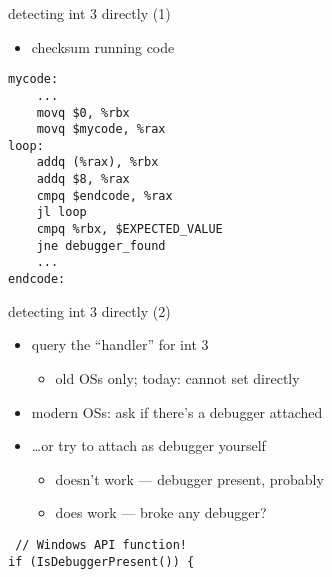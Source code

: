 \begin{frame}[fragile,label=int3Check]{detecting int 3 directly (1)}
\lstset{language=myasm,style=small}
\begin{itemize}
    \item checksum running code
\end{itemize}
\begin{lstlisting}
mycode:
    ...
    movq $0, %rbx
    movq $mycode, %rax
loop:
    addq (%rax), %rbx
    addq $8, %rax
    cmpq $endcode, %rax
    jl loop
    cmpq %rbx, $EXPECTED_VALUE
    jne debugger_found
    ...
endcode:
\end{lstlisting}
\end{frame}

\begin{frame}[fragile,label=int3OSAPI]{detecting int 3 directly (2)}
\lstset{language=C,style=small}
\begin{itemize}
    \item query the ``handler'' for int 3
        \begin{itemize}
        \item old OSs only; today: cannot set directly
        \end{itemize}
    \item modern OSs: ask if there's a debugger attached
    \item \ldots or try to attach as debugger yourself
        \begin{itemize}
        \item doesn't work --- debugger present, probably
        \item does work --- broke any debugger?
        \end{itemize}
\end{itemize}
\begin{lstlisting}
 // Windows API function!
if (IsDebuggerPresent()) {
\end{lstlisting}
\end{frame}

